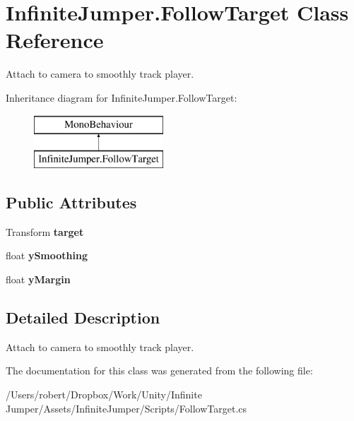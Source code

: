 \hypertarget{class_infinite_jumper_1_1_follow_target}{}\section{Infinite\+Jumper.\+Follow\+Target Class Reference}
\label{class_infinite_jumper_1_1_follow_target}


Attach to camera to smoothly track player.  


Inheritance diagram for Infinite\+Jumper.\+Follow\+Target\+:\begin{figure}[H]
\begin{center}
\leavevmode
\includegraphics[height=2.000000cm]{class_infinite_jumper_1_1_follow_target}
\end{center}
\end{figure}
\subsection*{Public Attributes}
\begin{DoxyCompactItemize}
\item 
\hypertarget{class_infinite_jumper_1_1_follow_target_a3babfea692dea01d9e2fa4fbbadaf0ed}{}Transform {\bfseries target}\label{class_infinite_jumper_1_1_follow_target_a3babfea692dea01d9e2fa4fbbadaf0ed}

\item 
\hypertarget{class_infinite_jumper_1_1_follow_target_a94235685fa477f10037749836bd591bd}{}float {\bfseries y\+Smoothing}\label{class_infinite_jumper_1_1_follow_target_a94235685fa477f10037749836bd591bd}

\item 
\hypertarget{class_infinite_jumper_1_1_follow_target_a926db5e66ae4174faf6321dfc2ab3b95}{}float {\bfseries y\+Margin}\label{class_infinite_jumper_1_1_follow_target_a926db5e66ae4174faf6321dfc2ab3b95}

\end{DoxyCompactItemize}


\subsection{Detailed Description}
Attach to camera to smoothly track player. 



The documentation for this class was generated from the following file\+:\begin{DoxyCompactItemize}
\item 
/\+Users/robert/\+Dropbox/\+Work/\+Unity/\+Infinite Jumper/\+Assets/\+Infinite\+Jumper/\+Scripts/Follow\+Target.\+cs\end{DoxyCompactItemize}
